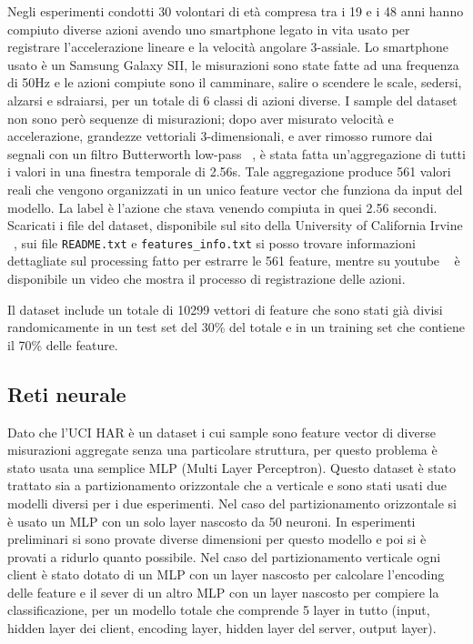 Negli esperimenti condotti 30 volontari di età compresa tra i 19 e i 48 anni
hanno compiuto diverse azioni avendo uno smartphone legato in vita 
usato per registrare l'accelerazione lineare e la velocità 
angolare 3-assiale. Lo smartphone usato è un Samsung Galaxy SII, le 
misurazioni sono state fatte ad una frequenza di 50Hz e le azioni compiute
sono il camminare, salire o scendere le scale, sedersi, alzarsi e 
sdraiarsi, per un totale di 6 classi di azioni diverse.
I sample del dataset non sono però sequenze di misurazioni; dopo 
aver misurato velocità e accelerazione, grandezze vettoriali 3-dimensionali,
e aver rimosso rumore dai segnali con un filtro Butterworth low-pass 
~\cite{butterworth_filter}, è stata fatta un'aggregazione di tutti i 
valori in una finestra temporale di 2.56s. Tale aggregazione produce 
561 valori reali che vengono organizzati in un unico feature vector 
che funziona da input del modello. La label è l'azione che stava venendo
compiuta in quei 2.56 secondi.
Scaricati i file del dataset, disponibile sul sito della 
University of California Irvine ~\cite{uci_har_ds}, sui file 
\texttt{README.txt} e \texttt{features\_info.txt}
si posso trovare informazioni dettagliate sul 
processing fatto per estrarre le 561 feature, mentre su youtube 
~\cite{har_measuring_video} è disponibile un video che mostra il 
processo di registrazione delle azioni.

Il dataset include un totale di 10299 vettori di feature che sono stati
già divisi randomicamente 
in un test set del 30\% del totale e in un training set 
che contiene il 70\% delle feature.


\subsection{Reti neurale}
Dato che l'UCI HAR è un dataset i cui sample sono feature vector di 
diverse misurazioni aggregate senza una particolare struttura, per 
questo problema è stato usata una semplice MLP (Multi Layer Perceptron).
Questo dataset è stato trattato sia a partizionamento orizzontale che 
a verticale e sono stati usati due modelli diversi per i due esperimenti.
Nel caso del partizionamento orizzontale si è usato un MLP con un solo 
layer nascosto da 50 neuroni. In esperimenti preliminari si sono provate 
diverse dimensioni per questo modello e poi si è provati a ridurlo 
quanto possibile.
Nel caso del partizionamento verticale ogni client è stato dotato di un 
MLP con un layer nascosto per calcolare l'encoding delle feature e il
sever di un altro MLP con un layer nascosto per compiere la 
classificazione, per un modello totale che 
comprende 5 layer in tutto (input, hidden layer dei client, encoding 
layer, hidden layer del server, output layer).
